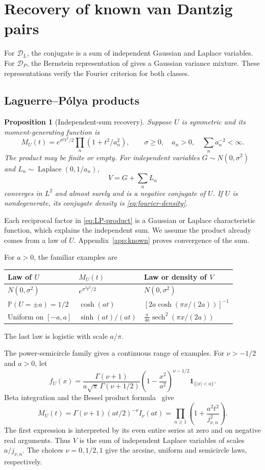 \documentclass[11pt,twoside]{article}
\theoremstyle{journalplain}
\numberwithin{equation}{section}
\newtheorem{proposition}[theorem]{Proposition}
\theoremstyle{journaldefinition}
\newcommand{\Prob}{\mathbb P}
\newcommand{\DL}{\mathcal D_L}
\newcommand{\DP}{\mathcal D_P}
\DeclareMathOperator{\sech}{sech}
\begin{document}
\section{Recovery of known van Dantzig pairs}\label{sec:known}
For $\DL$, the conjugate is a sum of independent Gaussian and Laplace variables. For $\DP$, the Bernstein representation of \cite{KPS2024} gives a Gaussian variance mixture. These representations verify the Fourier criterion for both classes.

\subsection{Laguerre--P\'olya products}
\begin{proposition}[Independent-sum recovery]\label{prop:LP}
Suppose $U$ is symmetric and its moment-generating function is
\begin{equation}\label{eq:LP-product}
 M_U(t)=e^{\sigma^2t^2/2}\prod_n(1+t^2/a_n^2),
 \qquad \sigma\ge0,\quad a_n>0,\quad\sum_n a_n^{-2}<\infty.
\end{equation}
The product may be finite or empty. For independent variables $G\sim N(0,\sigma^2)$ and $L_n\sim\operatorname{Laplace}(0,1/a_n)$,
\[
 V=G+\sum_n L_n
\]
converges in $L^2$ and almost surely and is a negative conjugate of $U$. If $U$ is nondegenerate, its conjugate density is \eqref{eq:fourier-density}.
\end{proposition}
Each reciprocal factor in \eqref{eq:LP-product} is a Gaussian or Laplace characteristic function, which explains the independent sum. We assume the product already comes from a law of $U$. Appendix~\ref{app:known} proves convergence of the sum.

For $a>0$, the familiar examples are
\begin{center}
\begin{tabular}{lll}
\toprule
Law of $U$ & $M_U(t)$ & Law or density of $V$\\
\midrule
$N(0,\sigma^2)$ & $e^{\sigma^2t^2/2}$ & $N(0,\sigma^2)$\\[3pt]
$\Prob(U=\pm a)=1/2$ & $\cosh(at)$ & $[2a\cosh(\pi x/(2a))]^{-1}$\\[3pt]
Uniform on $[-a,a]$ & $\sinh(at)/(at)$ & $\frac{\pi}{4a}\sech^2(\pi x/(2a))$\\
\bottomrule
\end{tabular}
\end{center}
The last law is logistic with scale $a/\pi$.

The power-semicircle family gives a continuous range of examples. For $\nu>-1/2$ and $a>0$, let
\[
 f_U(x)=\frac{\Gamma(\nu+1)}{a\sqrt\pi\,\Gamma(\nu+1/2)}
 \left(1-\frac{x^2}{a^2}\right)^{\nu-1/2}\mathbf1_{\{|x|<a\}}.
\]
Beta integration and the Bessel product formula\ \cite[Eq.~10.21.15]{DLMF} give
\begin{equation}\label{eq:bessel}
 M_U(t)=\Gamma(\nu+1)(at/2)^{-\nu}I_\nu(at)
 =\prod_{n\ge1}\left(1+\frac{a^2t^2}{j_{\nu,n}^2}\right).
\end{equation}
The first expression is interpreted by its even entire series at zero and on negative real arguments. Thus $V$ is the sum of independent Laplace variables of scales $a/j_{\nu,n}$. The choices $\nu=0,1/2,1$ give the arcsine, uniform and semicircle laws, respectively.
\end{document}
